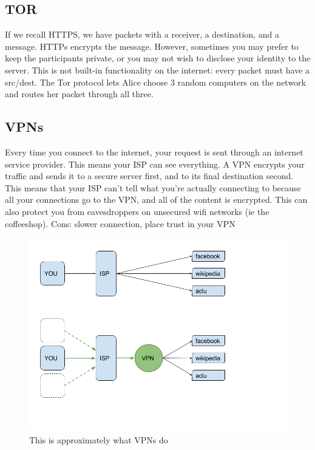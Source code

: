 \documentclass{article}
\begin{document}
\subsection{TOR}
If we recall HTTPS, we have packets with a receiver, a destination, and a message. HTTPs encrypts
the message. However, sometimes you may prefer to keep the participants private, or you may not
wish to disclose your identity to the server. This is not built-in functionality on the internet:
every packet must have a src/dest. The Tor protocol lets Alice choose 3 random computers on
the network and routes her packet through all three.  


\subsection{VPNs}
Every time you connect to the internet, your request is sent through an internet service
provider. This means your ISP can see everything.
A VPN encrypts your traffic and sends it to a secure server first, and to its final destination
second. This means that your ISP can’t tell what you’re actually connecting to because all
your connections go to the VPN, and all of the content is encrypted. This can also protect you
from eavesdroppers on unsecured wifi networks (ie the coffeeshop).
Cons: slower connection, place trust in your VPN

\begin{figure}
\includegraphics[width=\textwidth]{vpn}
\caption{This is approximately what VPNs do}
\end{figure}
\end{document}
